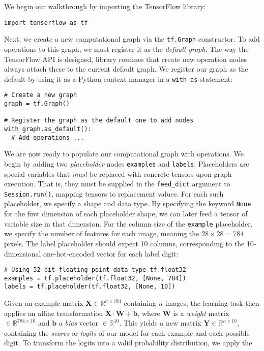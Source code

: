 We begin our walkthrough by importing the TensorFlow library:
%
\begin{lstlisting}
import tensorflow as tf
\end{lstlisting}
%
Next, we create a new computational graph via the \texttt{tf.Graph}
constructor. To add operations to this graph, we must register it as the
\emph{default graph}. The way the TensorFlow API is designed, library routines
that create new operation nodes always attach these to the current default
graph. We register our graph as the default by using it as a Python context
manager in a \texttt{with-as} statement:
%
\begin{lstlisting}
# Create a new graph
graph = tf.Graph()

# Register the graph as the default one to add nodes
with graph.as_default():
  # Add operations ...
\end{lstlisting}
%
We are now ready to populate our computational graph with operations. We begin
by adding two \emph{placeholder} nodes \texttt{examples} and
\texttt{labels}. Placeholders are special variables that \emph{must} be replaced
with concrete tensors upon graph execution. That is, they must be supplied in
the \texttt{feed\_dict} argument to \texttt{Session.run()}, mapping tensors to
replacement values. For each such placeholder, we specify a shape and data
type. By specifying the keyword \texttt{None} for the first dimension of each
placeholder shape, we can later feed a tensor of variable size in that
dimension. For the column size of the \texttt{example} placeholder, we specify
the number of features for each image, meaning the $28 \times 28 = 784$
pixels. The label placeholder should expect 10 columns, corresponding to the
10-dimensional one-hot-encoded vector for each label digit:
%
\begin{lstlisting}
# Using 32-bit floating-point data type tf.float32
examples = tf.placeholder(tf.float32, [None, 784])
labels = tf.placeholder(tf.float32, [None, 10])
\end{lstlisting}
%
Given an example matrix $\mathbf{X} \in \mathbb{R}^{n \times 784}$ containing
$n$ images, the learning task then applies an affine transformation
$\mathbf{X} \cdot \mathbf{W} + \mathbf{b}$, where $\mathbf{W}$ is a
\emph{weight} matrix $\in \mathbb{R}^{784 \times 10}$ and $\mathbf{b}$ a
\emph{bias} vector $\in \mathbb{R}^{10}$. This yields a new matrix
$\mathbf{Y} \in \mathbb{R}^{n \times 10}$, containing the \emph{scores} or
\emph{logits} of our model for each example and each possible digit. To
transform the logits into a valid probability distribution, we apply the
